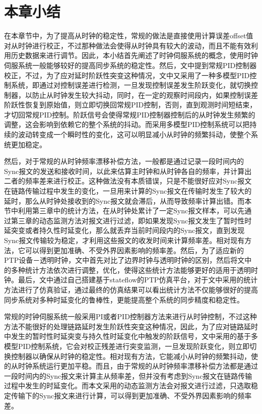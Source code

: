 \section{本章小结}
在本章节中，为了提高从时钟的稳定性，常规的做法是直接使用计算误差offset值对从时钟进行校正，不过那种做法会使得从时钟具有较大的波动，而且不能有效利用历史数据来进行调节。因此，本小结首先阐述了时钟伺服系统的概念，使用时钟伺服系统一般能够较好的提高同步系统的稳定性。然后，文中提到常规PID控制器校正，不过，为了应对延时阶跃性突变这种情况，文中又采用了一种多模型PID控制系统，即通过对控制误差进行检测，一旦发现控制误差发生阶跃变化，就切换控制器，以防止从时钟发生较大抖动，同时，在一定的观察时间段内，如果控制误差阶跃性恢复到原始值，则立即切换回常规PID控制，否则，直到观测时间短结束，才切回常规PID控制。阶跃信号会使得常规PID控制器控制后的从时钟发生频繁的调整，这会影响到依赖它的整个系统的抖动。而采用多模型PID控制系统可以把持续的波动转变成一个瞬时性的变化，这可以明显减小从时钟的频繁抖动，使整个系统更加稳定。

然后，对于常规的从时钟频率漂移补偿方法，一般都是通过记录一段时间内的Sync报文的发送和接收时间，以此来估算主时钟和从时钟各自的频率，并计算出二者的频率差来进行校正。这种做法没有本质错误，只是不能很好应对Sync报文在链路传输过程中发生的变化，一旦用来计算的Sync报文在传输时发生了较大的延时，那么从时钟处接收到的Sync报文就会滞后，从而导致频率计算出错。而本节中利用第三章中的统计方法，在从时钟处累计了一定Sync报文样本，可以先通过第三章的动态监测方法对报文进行过滤，即如果发现Sync报文发生了暂时性时延突变或者持久性时延变化，那么就丢弃当前时间段内的Sync报文，直到发现Sync报文传输较为稳定，才利用这些报文的收发时间来计算频率差。相对现有方法，它可以得到更加准确、不受外界因素影响的频率差。然后，为了适应新的PTP设备－透明时钟，文中首先对比了边界时钟与透明时钟的区别，然后将文中的多种统计方法依次进行调整，优化，使得这些统计方法能够更好的适用于透明时钟。最后，文中通过自己搭建基于stateflow的PTP仿真平台，对于文中采用的统计方法进行了仿真验证，通过最终的仿真结果可以看出统计方法不仅能够很好的提高同步系统对多种时延变化的鲁棒性，更能提高整个系统的同步精度和稳定性。

常规的时钟伺服系统一般采用PI或者PID控制器方法来进行从时钟控制，不过这种方法不能很好的处理链路延时发生阶跃性突变这种情况，因此，为了应对链路延时中发生的暂时性时延突变与持久性时延变化中触发的阶跃信号，文中采用的基于多模型PID控制系统，它会对校正残差进行突变监测，一旦发现阶跃变化，则立即切换控制器以确保从时钟的稳定性。相对现有方法，它能减小从时钟的频繁抖动，使的从时钟系统运行更加平稳。而且，由于常规的从时钟频率漂移补偿方法都是通过一段时间内的Sync报文来计算主从频率差，但并没有考虑到Sync报文在链路传输过程中发生的时延变化。而本文采用的动态监测方法会对报文进行过滤，只选取稳定传输下的Sync报文来进行计算，可以得到更加准确、不受外界因素影响的频率差。



